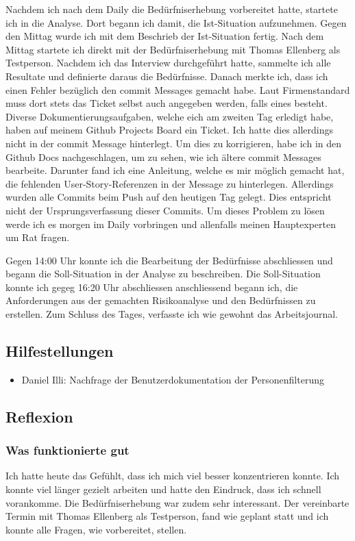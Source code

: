 Nachdem ich nach dem Daily die Bedürfniserhebung vorbereitet hatte,
startete ich in die Analyse. Dort begann ich damit, die Ist-Situation aufzunehmen. Gegen den Mittag wurde ich mit dem Beschrieb der 
Ist-Situation fertig. Nach dem Mittag startete ich direkt mit der Bedürfniserhebung mit Thomas Ellenberg als Testperson. Nachdem ich das Interview 
durchgeführt hatte, sammelte ich alle Resultate und definierte daraus die Bedürfnisse. Danach merkte ich, dass ich einen Fehler bezüglich den commit Messages gemacht habe.
Laut Firmenstandard muss dort stets das Ticket selbst auch angegeben werden, falls eines besteht. Diverse Dokumentierungsaufgaben, welche eich am zweiten Tag erledigt habe,
haben auf meinem Github Projects Board ein Ticket. Ich hatte dies allerdings nicht in der commit Message hinterlegt. Um dies zu korrigieren, habe ich in den Github Docs nachgeschlagen,
um zu sehen, wie ich ältere commit Messages bearbeite. Darunter fand ich eine Anleitung, welche es mir möglich gemacht hat, die fehlenden User-Story-Referenzen in der 
Message zu hinterlegen. Allerdings wurden alle Commits beim Push auf den heutigen Tag gelegt. Dies entspricht nicht der Ursprungsverfassung dieser Commits.
Um dieses Problem zu lösen werde ich es morgen im Daily vorbringen und allenfalls meinen Hauptexperten um Rat fragen.

Gegen 14:00 Uhr konnte ich die Bearbeitung der Bedürfnisse
abschliessen und begann die Soll-Situation in der Analyse zu beschreiben. Die Soll-Situation konnte ich gegeg 16:20 Uhr abschliessen anschliessend begann ich,
die Anforderungen aus der gemachten Risikoanalyse und den Bedürfnissen zu erstellen. Zum Schluss des Tages, verfasste ich wie gewohnt das Arbeitsjournal.

\subsection*{Hilfestellungen}
\begin{itemize}
    \item Daniel Illi: Nachfrage der Benutzerdokumentation der Personenfilterung
\end{itemize}

\subsection*{Reflexion}

\subsubsection*{Was funktionierte gut}
Ich hatte heute das Gefühlt, dass ich mich viel besser konzentrieren konnte. Ich konnte viel länger gezielt arbeiten
und hatte den Eindruck, dass ich schnell vorankomme. Die Bedürfniserhebung war zudem sehr interessant. Der vereinbarte Termin
mit Thomas Ellenberg als Testperson, fand wie geplant statt und ich konnte alle Fragen, wie vorbereitet, stellen.

